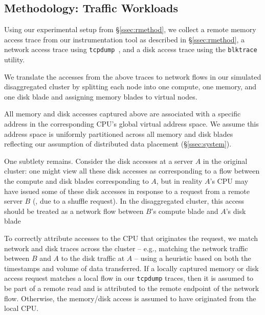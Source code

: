 \subsection{Methodology: \dis Traffic Workloads}
\label{ssec:ssmethod-traffic}
\vspace{-0.05in}
Using our experimental setup from \S\ref{ssec:rmethod}, we collect a remote memory access trace from our instrumentation tool as described in \S\ref{ssec:rmethod}, a network access trace using {\tt tcpdump}~\cite{tcpdump}, and a disk access trace using the {\tt blktrace} utility.

We translate the accesses from the above traces to network flows 
in our simulated disaggregated cluster by splitting each node into one compute, one memory, and one disk blade and assigning memory blades to virtual nodes.

All memory and disk accesses captured above are associated with a specific address in the corresponding CPU's global virtual address space. We assume this address space is uniformly partitioned across all memory and disk blades reflecting our assumption of distributed data placement (\S\ref{ssec:system}).  

One subtlety remains. Consider the disk accesses at a server $A$ in the original cluster: one might view all these disk accesses as corresponding to a flow between the compute  and disk blades corresponding to $A$, but in reality $A$'s CPU may have issued some of these disk accesses in response to a request from a remote server $B$ (\eg, due to a shuffle request). 
In the disaggregated cluster, this access should be treated as a network flow between \emph{$B$}'s compute blade and $A$'s disk blade %

To correctly attribute accesses to the CPU that originates the request, we match network and disk traces across the cluster -- e.g., matching the network traffic between $B$ and $A$ to the disk traffic at $A$ -- using a heuristic based on both the timestamps and volume of data transferred. 
If a locally captured memory or disk access request matches a local flow in our {\tt tcpdump} traces, then it is assumed to be part of a remote read and is attributed to the remote endpoint of the network flow.
Otherwise, the memory/disk access is assumed to have originated from the local CPU. 
%

